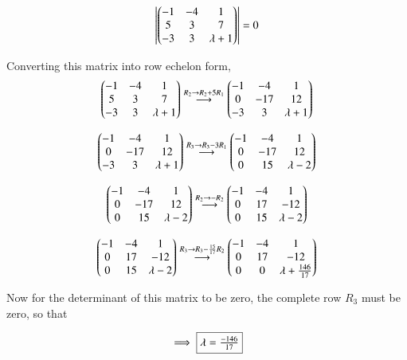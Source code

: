 \documentclass[journal,12pt,onecolumn]{IEEEtran}
\theoremstyle{remark}
\begin{document}
\begin{equation}
    \left\vert\begin{pmatrix}-1 & -4 & 1\\5 & 3 &7\\-3 & 3 & \lambda+1\end{pmatrix}\right\vert = 0
\end{equation}

Converting this matrix into row echelon form,
\begin{equation}
 \begin{pmatrix}-1 & -4 & 1\\5 & 3 &7\\-3 & 3 & \lambda+1\end{pmatrix} \overset{R_2 \rightarrow R_2 + 5R_1}{\longrightarrow} \begin{pmatrix}-1 & -4 & 1\\0 & -17 & 12\\-3 & 3 & \lambda+1\end{pmatrix}
\end{equation}

\begin{equation}
    \begin{pmatrix}-1 & -4 & 1\\0 & -17 & 12\\-3 & 3 & \lambda+1\end{pmatrix} \overset{R_3 \rightarrow R_3 - 3R_1}{\longrightarrow} \begin{pmatrix}-1 & -4 & 1\\0 & -17 & 12\\0 & 15 & \lambda-2\end{pmatrix}
\end{equation}

\begin{equation}
    \begin{pmatrix}-1 & -4 & 1\\0 & -17 & 12\\0 & 15 & \lambda-2\end{pmatrix} \overset{R_2 \rightarrow -R_2}{\longrightarrow} \begin{pmatrix}-1 & -4 & 1\\0 & 17 & -12\\0 & 15 & \lambda-2\end{pmatrix}
\end{equation}

\begin{equation}
    \begin{pmatrix}-1 & -4 & 1\\0 & 17 & -12\\0 & 15 & \lambda-2\end{pmatrix} \overset{R_3 \rightarrow R_3 - \frac{15}{17}R_2}{\longrightarrow} \begin{pmatrix}-1 & -4 & 1\\0 & 17 & -12\\0 & 0 & \lambda+\frac{146}{17}\end{pmatrix}
\end{equation}

Now for the determinant of this matrix to be zero, the complete row $R_3$ must be zero, so that

\begin{equation}
    \implies \fbox{$\lambda = \frac{-146}{17}$}
\end{equation}
\end{document}
